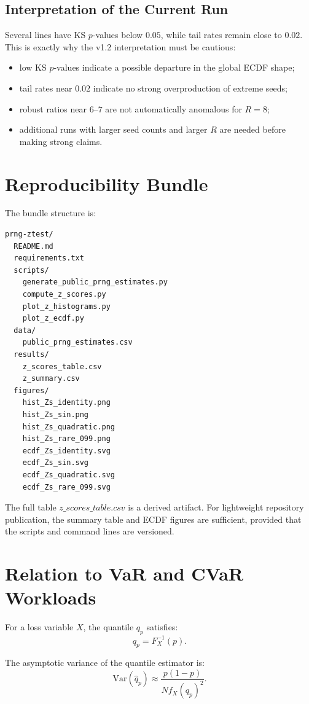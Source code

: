 \documentclass[11pt,a4paper]{article}
\newcommand{\Var}{\mathrm{Var}}
\begin{document}
\subsection{Interpretation of the Current Run}

Several lines have KS \(p\)-values below \(0.05\), while tail rates remain close to \(0.02\). This is exactly why the v1.2 interpretation must be cautious:
\begin{itemize}
  \item low KS \(p\)-values indicate a possible departure in the global ECDF shape;
  \item tail rates near \(0.02\) indicate no strong overproduction of extreme seeds;
  \item robust ratios near \(6\)--\(7\) are not automatically anomalous for \(R=8\);
  \item additional runs with larger seed counts and larger \(R\) are needed before making strong claims.
\end{itemize}

\section{Reproducibility Bundle}

The bundle structure is:
\begin{verbatim}
prng-ztest/
  README.md
  requirements.txt
  scripts/
    generate_public_prng_estimates.py
    compute_z_scores.py
    plot_z_histograms.py
    plot_z_ecdf.py
  data/
    public_prng_estimates.csv
  results/
    z_scores_table.csv
    z_summary.csv
  figures/
    hist_Zs_identity.png
    hist_Zs_sin.png
    hist_Zs_quadratic.png
    hist_Zs_rare_099.png
    ecdf_Zs_identity.svg
    ecdf_Zs_sin.svg
    ecdf_Zs_quadratic.svg
    ecdf_Zs_rare_099.svg
\end{verbatim}

The full table \(z\_scores\_table.csv\) is a derived artifact. For lightweight repository publication, the summary table and ECDF figures are sufficient, provided that the scripts and command lines are versioned.

\section{Relation to VaR and CVaR Workloads}

For a loss variable \(X\), the quantile \(q_p\) satisfies:
\[
q_p=F_X^{-1}(p).
\]

The asymptotic variance of the quantile estimator is:
\[
\Var(\hat q_p)
\approx
\frac{p(1-p)}
{N f_X(q_p)^2}.
\]
\end{document}
